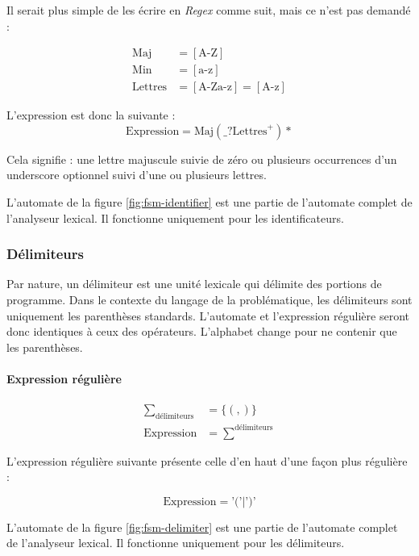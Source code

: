 Il serait plus simple de les écrire en \textit{Regex} comme suit, mais ce
n’est pas demandé :

\begin{align}
  \text{Maj} &= [\textrm{A-Z}] \\
  \text{Min} &= [\textrm{a-z}] \\
  \text{Lettres} &= [\textrm{A-Za-z}] = [\textrm{A-z}]
\end{align}

L'expression est donc la suivante :
\begin{equation}
  \textrm{Expression}=\textrm{Maj} (\_?\textrm{Lettres}^+)*
\end{equation}

Cela signifie : une lettre majuscule suivie de zéro ou plusieurs occurrences
d’un underscore optionnel suivi d’une ou plusieurs lettres.

L'automate de la figure \ref{fig:fsm-identifier} est une partie de l'automate
complet de l'analyseur lexical. Il fonctionne uniquement pour les
identificateurs.

\subsubsection{Délimiteurs}

Par nature, un délimiteur est une unité lexicale qui délimite des portions de
programme. Dans le contexte du langage de la problématique, les délimiteurs
sont uniquement les parenthèses standards. L'automate et l'expression
régulière seront donc identiques à ceux des opérateurs. L'alphabet change
pour ne contenir que les parenthèses.

\paragraph{Expression régulière}

\begin{align}
  \sum_{\textrm{délimiteurs}} &= \{(,)\} \\
  \textrm{Expression} &= \sum^{\textrm{délimiteurs}}
\end{align}

L'expression régulière suivante présente celle d'en haut d'une façon plus
régulière :

\begin{equation}
  \textrm{Expression} = \textrm{'('} | \textrm{')'}
\end{equation}

L'automate de la figure \ref{fig:fsm-delimiter} est une partie de l'automate
complet de l'analyseur lexical. Il fonctionne uniquement pour les délimiteurs.

